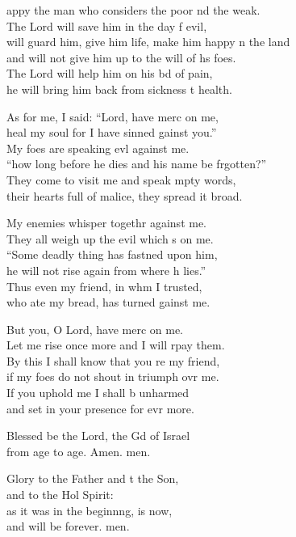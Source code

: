 \settowidth{\versewidth}{will guard him, give him life, make him happy in the land *}
\begin{psalmverse}%
  \begin{patverse}
appy the man who considers the poor nd the weak.\Med\\
The Lord will save him in the day f evil,\\
will guard him, give him life, make him happy \pointup{\i}n the land\Med\\
and will not give him up to the will of h\pointup{\i}s foes.\\
The Lord will help him on his bd of pain,\Med\\
he will bring him back from sickness t health.

As for me, I said: “Lord, have merc on me,\Med\\
heal my soul for I have sinned gainst you.”\\
My foes are speaking ev\pointup{\i}l against me.\Med\\
“how long before he dies and his name be frgotten?”\\
They come to visit me and speak mpty words,\Med\\
their hearts full of malice, they spread it broad.

My enemies whisper togethr against me.\Med\\
They all weigh up the evil which \pointup{\i}s on me.\\
“Some deadly thing has fastned upon him,\Med\\
he will not rise again from where h lies.”\\
Thus even my friend, in whm I trusted,\Med\\
who ate my bread, has turned gainst me.

But you, O Lord, have merc on me.\Med\\
Let me rise once more and I will rpay them.\\
By this I shall know that you re my friend,\Med\\
if my foes do not shout in triumph ovr me.\\
If you uphold me I shall b unharmed\Med\\
and set in your presence for evr more.

Blessed be the Lord, the Gd of Israel\Med\\
from age to age. Amen. men.

Glory to the Father and t the Son,\Med\\
and to the Hol Spirit:\\
as it was in the beginn\pointup{\i}ng, is now,\Med\\
and will be forever. men. 
  \end{patverse}
\end{psalmverse}
